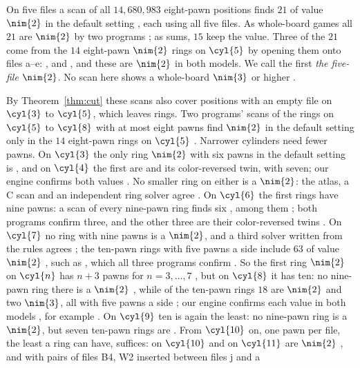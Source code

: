 On five files a scan of all $14{,}680{,}983$ eight-pawn positions finds $21$ of value $\nim{2}$ in the default
setting , each using all five files. As whole-board games all $21$ are $\nim{2}$ by two programs ;
as sums, $15$ keep the value. Three of the
$21$ come from the $14$ eight-pawn $\nim{2}$ rings on $\cyl{5}$  by opening them onto files a--e:
,  and
,
and these are $\nim{2}$ in both models. We call the first \emph{the five-file $\nim{2}$}. No scan here shows a whole-board $\nim{3}$ or higher
.

By Theorem~\ref{thm:cut} these scans also cover positions with an empty file on $\cyl{3}$ to $\cyl{5}$, which
leaves rings. Two programs' scans of the rings on
$\cyl{5}$ to $\cyl{8}$ with at most eight pawns find $\nim{2}$ in the default setting only in the $14$
eight-pawn rings on $\cyl{5}$ . Narrower cylinders need fewer pawns. On $\cyl{3}$ the only ring
$\nim{2}$ with six pawns in the default setting is , and on $\cyl{4}$ the first
are  and its color-reversed twin, with seven; our engine confirms both values
. No smaller ring on either is a $\nim{2}$: the atlas, a C scan and an independent ring solver agree
. On $\cyl{6}$ the first rings have nine pawns: a scan of every
nine-pawn ring finds six , among them ; both programs confirm
three, and the other three are their color-reversed twins . On $\cyl{7}$ no ring with nine pawns is a
$\nim{2}$, and a third solver written from the rules agrees ; the ten-pawn rings with five pawns a side
include $63$ of value $\nim{2}$ , such as , which all three
programs confirm . So the first ring $\nim{2}$ on $\cyl{n}$ has $n+3$ pawns for $n=3,\dots,7$
, but on $\cyl{8}$ it has ten: no nine-pawn ring there is a $\nim{2}$ , while of the ten-pawn
rings $18$ are $\nim{2}$ and two $\nim{3}$, all with five pawns a side ; our engine
confirms each value in both models , for example . On $\cyl{9}$
ten is again the least: no nine-pawn ring is a $\nim{2}$, but seven ten-pawn rings are . From $\cyl{10}$ on, one pawn per file, the least a
ring can have, suffices:  on $\cyl{10}$ and  on $\cyl{11}$ are $\nim{2}$ , and with pairs of files B4, W2 inserted between files j and a
